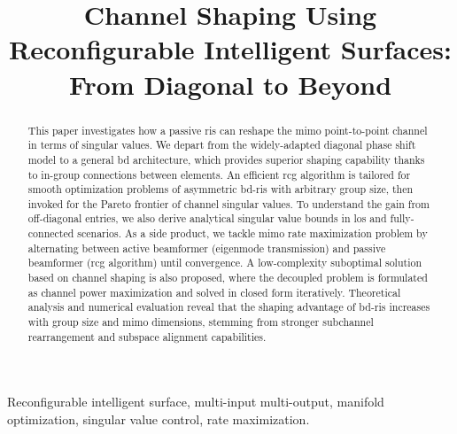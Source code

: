 \documentclass[journal]{IEEEtran}
\begin{document}
\title{Channel Shaping Using Reconfigurable Intelligent Surfaces: From Diagonal to Beyond}
\author{
}
\maketitle

\begin{abstract}
	This paper investigates how a passive \gls{ris} can reshape the \gls{mimo} point-to-point channel in terms of singular values.
	We depart from the widely-adapted diagonal phase shift model to a general \gls{bd} architecture, which provides superior shaping capability thanks to in-group connections between elements.
	An efficient \gls{rcg} algorithm is tailored for smooth optimization problems of asymmetric \gls{bd}-\gls{ris} with arbitrary group size, then invoked for the Pareto frontier of channel singular values.
	To understand the gain from off-diagonal entries, we also derive analytical singular value bounds in \gls{los} and fully-connected scenarios.
	As a side product, we tackle \gls{mimo} rate maximization problem by alternating between active beamformer (eigenmode transmission) and passive beamformer (\gls{rcg} algorithm) until convergence.
	A low-complexity suboptimal solution based on channel shaping is also proposed, where the decoupled problem is formulated as channel power maximization and solved in closed form iteratively.
	Theoretical analysis and numerical evaluation reveal that the shaping advantage of \gls{bd}-\gls{ris} increases with group size and \gls{mimo} dimensions, stemming from stronger subchannel rearrangement and subspace alignment capabilities.
\end{abstract}

\begin{IEEEkeywords}
	Reconfigurable intelligent surface, multi-input multi-output, manifold optimization, singular value control, rate maximization.
\end{IEEEkeywords}
\end{document}
